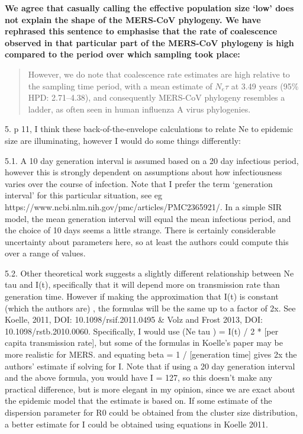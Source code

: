 \documentclass[11pt,oneside,letterpaper]{article}
\begin{document}
\textbf{We agree that casually calling the effective population size `low' does not explain the shape of the MERS-CoV phylogeny. We have rephrased this sentence to emphasise that the rate of coalescence observed in that particular part of the MERS-CoV phylogeny is high compared to the period over which sampling took place:}

\begin{quotation}
However, we do note that coalescence rate estimates are high relative to the sampling time period, with a mean estimate of $N_e\tau$ at 3.49 years (95\% HPD: 2.71--4.38), and consequently MERS-CoV phylogeny resembles a ladder, as often seen in human influenza A virus phylogenies.
\end{quotation}

5. p 11, I think these back-of-the-envelope calculations to relate Ne to epidemic size are illuminating, however I would do some things differently:

5.1. A 10 day generation interval is assumed based on a 20 day infectious period, however this is strongly dependent on assumptions about how infectiousness varies over the course of infection. Note that I prefer the term `generation interval' for this particular situation, see eg https://www.ncbi.nlm.nih.gov/pmc/articles/PMC2365921/. In a simple SIR model, the mean generation interval will equal the mean infectious period, and the choice of 10 days seems a little strange. There is certainly considerable uncertainty about parameters here, so at least the authors could compute this over a range of values.

\textbf{}

5.2. Other theoretical work suggests a slightly different relationship between Ne tau and I(t), specifically that it will depend more on transmission rate than generation time. However if making the approximation that I(t) is constant (which the authors are) , the formulas will be the same up to a factor of 2x. See Koelle, 2011, DOI: 10.1098/rsif.2011.0495 \& Volz and Frost 2013, DOI: 10.1098/rstb.2010.0060. Specifically, I would use (Ne tau ) = I(t) / 2 * [per capita transmission rate], but some of the formulas in Koelle's paper may be more realistic for MERS.
and equating beta = 1 / [generation time] gives 2x the authors' estimate if solving for I.
Note that if using a 20 day generation interval and the above formula, you would have I = 127, so this doesn't make any practical difference, but is more elegant in my opinion, since we are exact about the epidemic model that the estimate is based on. If some estimate of the dispersion parameter for R0 could be obtained from the cluster size distribution, a better estimate for I could be obtained using equations in Koelle 2011.
\end{document}

